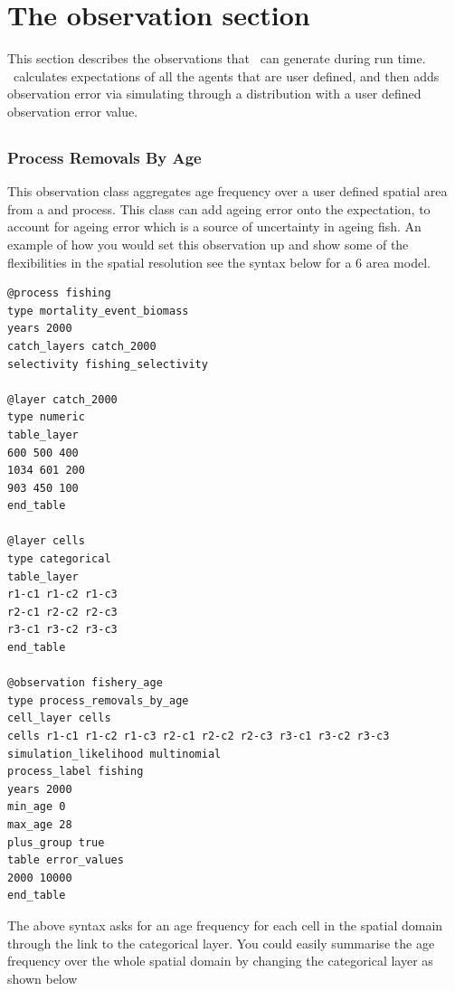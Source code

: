 \section{The observation section\label{sec:observation-section}}
This section describes the observations that \IBM\ can generate during run time. \IBM\ calculates expectations of all the agents that are user defined, and then adds observation error via simulating through a distribution with a user defined observation error value.
\subsection{\label{sec:Observations}}

\subsubsection{Process Removals By Age}\label{subsubsec:catch_at_age}
This observation class aggregates age frequency over a user defined spatial area from a  and  process. This class can add ageing error onto the expectation, to account for ageing error which is a source of uncertainty in ageing fish. An example of how you would set this observation up and show some of the flexibilities in the spatial resolution see the syntax below for a 6 area model.

{\small{\begin{verbatim}
@process fishing
type mortality_event_biomass
years 2000
catch_layers catch_2000
selectivity fishing_selectivity

@layer catch_2000
type numeric
table_layer
600 500 400
1034 601 200
903 450 100
end_table

@layer cells
type categorical
table_layer
r1-c1 r1-c2 r1-c3
r2-c1 r2-c2 r2-c3
r3-c1 r3-c2 r3-c3
end_table

@observation fishery_age
type process_removals_by_age
cell_layer cells
cells r1-c1 r1-c2 r1-c3 r2-c1 r2-c2 r2-c3 r3-c1 r3-c2 r3-c3
simulation_likelihood multinomial
process_label fishing
years 2000
min_age 0
max_age 28
plus_group true
table error_values
2000 10000
end_table
\end{verbatim}}}

The above syntax asks for an age frequency for each cell in the spatial domain through the link to the categorical layer. You could easily summarise the age frequency over the whole spatial domain by changing the categorical layer as shown below

